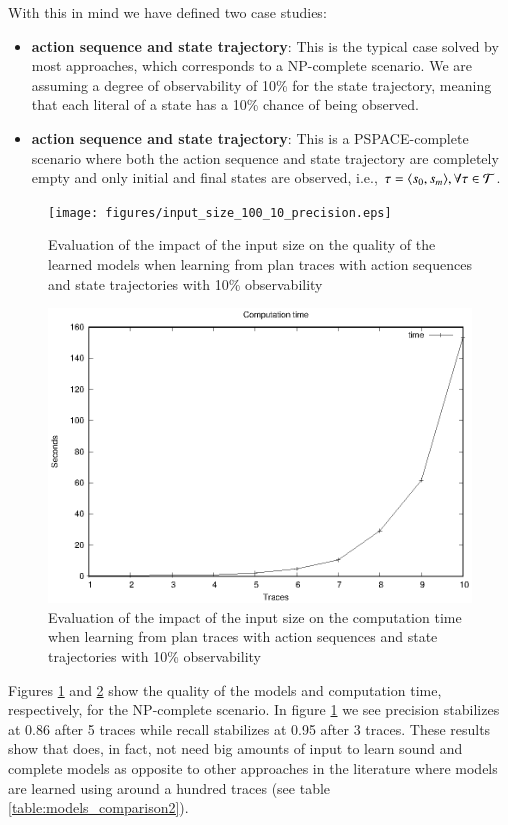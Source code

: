 With this in mind we have defined two case studies:
\begin{itemize}
	\item \textbf{\FO action sequence and \PO state trajectory}: This is the typical case solved by most approaches, which corresponds to a NP-complete scenario. We are assuming a degree of observability of 10\% for the state trajectory, meaning that each literal of a state has a 10\% chance of being observed.
	\item  \textbf{\NO action sequence and \NO state trajectory}: This is a PSPACE-complete scenario where both the action sequence and state trajectory are completely empty and only initial and final states are observed, i.e., $\tau = {\langle s_0, s_m \rangle}, \forall \tau \in \mathcal{T}$.
\end{itemize}

\begin{figure}[hbt!]
	\centering
	\texttt{[image: figures/input\_size\_100\_10\_precision.eps]}
	\caption{Evaluation of the impact of the input size on the quality of the learned models when learning from plan traces with \FO action sequences and \PO state trajectories with 10\% observability}
	\label{fig:np_quality}
\end{figure}

\begin{figure}[hbt!]
	\centering
	\includegraphics[width=0.8\linewidth]{figures/input_size_100_10_time.eps}
	\caption{Evaluation of the impact of the input size on the computation time when learning from plan traces with \FO action sequences and \PO state trajectories with 10\% observability}
	\label{fig:np_time}
\end{figure}

Figures \ref{fig:np_quality} and \ref{fig:np_time} show the quality of the models and computation time, respectively, for the NP-complete scenario. In figure \ref{fig:np_quality} we see precision stabilizes at 0.86 after 5 traces while recall stabilizes at 0.95 after 3 traces. These results show that \FAMA does, in fact, not need big amounts of input to learn sound and complete models as opposite to other approaches in the literature where models are learned using around a hundred traces (see table \ref{table:models_comparison2}).

